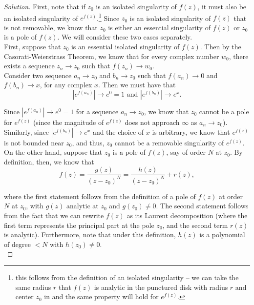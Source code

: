 \documentclass[11pt]{article}
\newenvironment{solution}
  {\renewcommand\qedsymbol{$\blacksquare$}\begin{proof}[Solution]}
  {\end{proof}}
\theoremstyle{definition}
\begin{document}
\begin{solution} First, note that if $z_0$ is an isolated singularity of $f(z)$, it must also be an isolated singularity of $e^{f(z)}$.\footnote{this follows from the definition of an isolated singularity -- we can take the same radius $r$ that $f(z)$ is analytic in the punctured disk with radius $r$ and center $z_0$ in and the same property will hold for $e^{f(z)}$.} 
Since $z_0$ is an isolated singularity of $f(z)$ that is not removable, we know that $z_0$ is either an essential singularity of $f(z)$ or $z_0$ is a pole of $f(z)$. We will consider these two cases separately.\\

First, suppose that $z_0$ is an essential isolated singularity of $f(z)$. Then by the Casorati-Weierstrass Theorem, we know that for every complex number $w_0$, there exists a sequence $z_n \rightarrow z_0$ such that $f(z_n) \rightarrow w_0$. \\

Consider two sequence $a_n \rightarrow z_0$ and $b_n \rightarrow z_0$ such that $f(a_n) \rightarrow 0$ and $f(b_n) \rightarrow x$, for any complex $x$. Then we must have that
\[ \left|e^{f(a_n)}\right| \rightarrow e^0 = 1 \text{ and } \left|e^{f(b_n)} \right| \rightarrow e^{x}.\]

Since $\left|e^{f(a_n)}\right| \rightarrow e^0 = 1$ for a sequence $a_n \rightarrow z_0$, we know that $z_0$ cannot be a pole for $e^{f(z)}$ (since the magnitude of $e^{f(z)}$ does not approach $\infty$ as $a_n \rightarrow z_0$). Similarly, since $\left|e^{f(b_n)} \right| \rightarrow e^{x}$ and the choice of $x$ is arbitrary, we know that
$e^{f(z)}$ is not bounded near $z_0$, and thus, $z_0$ cannot be a removable singularity of $e^{f(z)}$. \\

On the other hand, suppose that $z_0$ is a pole of $f(z)$, say of order $N$ at $z_0$. By definition, then, we know that \[ f(z) = \frac{g(z)}{(z-z_0)^N} = \frac{h(z)}{(z-z_0)^N} + r(z),\]

where the first statement follows from the definition of a pole of $f(z)$ at order $N$ at $z_0$, with $g(z)$ analytic at $z_0$ and $g(z_0) \neq 0$.
The second statement follows from the fact that we can rewrite $f(z)$ as its Laurent decomposition (where the first term represents the principal part at the pole $z_0$, and the second term $r(z)$ is analytic). Furthermore, note that under this definition, $h(z)$ is a polynomial of degree $<N$ with $h(z_0) \neq 0$. \\


\end{solution}
\end{document}
